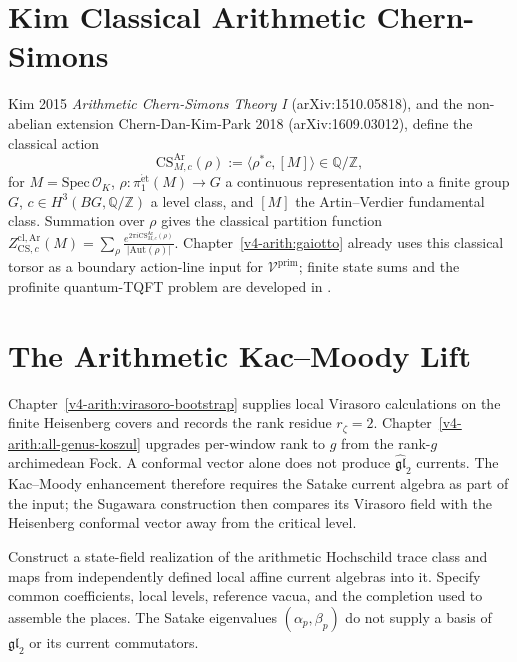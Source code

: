 \section{Kim Classical Arithmetic Chern-Simons}
\label{v4-arith:3d-acs:kim}

Kim 2015 \emph{Arithmetic Chern-Simons Theory I} (arXiv:1510.05818), and
the non-abelian extension Chern-Dan-Kim-Park 2018 (arXiv:1609.03012),
define the classical action
\begin{equation}
\label{v4-arith:3d-acs:eq:kim-action}
\mathrm{CS}^{\mathrm{Ar}}_{M,c}(\rho):=\langle\rho^{*}c,[M]\rangle\in\mathbb{Q}/\mathbb{Z},
\end{equation}
for \(M=\mathrm{Spec}\,\mathcal{O}_K\), \(\rho:\pi_{1}^{\mathrm{\acute{e}t}}(M)\to G\)
a continuous representation into a finite group \(G\), \(c\in H^{3}(BG,\mathbb{Q}/\mathbb{Z})\)
a level class, and \([M]\) the Artin--Verdier fundamental class. Summation
over \(\rho\) gives the classical partition function
\(Z^{\mathrm{cl,Ar}}_{\mathrm{CS},c}(M)=\sum_{\rho}\frac{e^{2\pi i\mathrm{CS}^{\mathrm{Ar}}_{M,c}(\rho)}}{|\mathrm{Aut}(\rho)|}\).
Chapter~\ref{v4-arith:gaiotto} already uses this classical torsor as a
boundary action-line input for \(\mathcal{V}^{\mathrm{prim}}\); finite state
sums and the profinite quantum-TQFT problem are developed in
.

\section{The Arithmetic Kac--Moody Lift}
\label{v4-arith:3d-acs:km-lift}

Chapter~\ref{v4-arith:virasoro-bootstrap} supplies local Virasoro
calculations on the finite Heisenberg covers and records the rank
residue \(r_{\zeta}=2\). Chapter~\ref{v4-arith:all-genus-koszul}
upgrades per-window rank to \(g\) from the rank-\(g\) archimedean
Fock. A conformal vector alone does not produce
\(\widehat{\mathfrak{gl}}_{2}\) currents. The Kac--Moody enhancement
therefore requires the Satake current algebra as part of the input; the
Sugawara construction then compares its Virasoro field with the
Heisenberg conformal vector away from the critical level.

\begin{question}
\label{v4-arith:3d-acs:thm:km-lift}
Construct a state-field realization of the arithmetic Hochschild
trace class and maps from independently defined local affine current
algebras into it. Specify common coefficients, local levels,
reference vacua, and the completion used to assemble the places.
The Satake eigenvalues \((\alpha_p,\beta_p)\) do not supply a basis
of \(\mathfrak{gl}_2\) or its current commutators.
\end{question}

